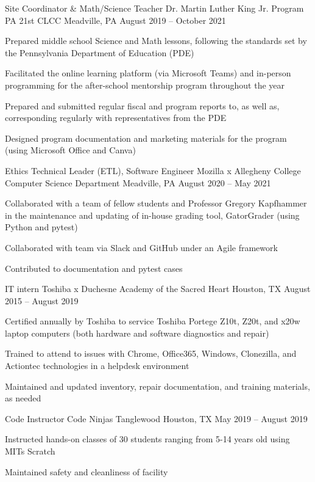 \begin{cventries}
    \cventry
    {Site Coordinator \& Math/Science Teacher}
    {Dr. Martin Luther King Jr. Program PA 21st CLCC}
    {Meadville, PA}
    {August 2019 – October 2021}
	{\begin{cvitems}
		\item {Prepared middle school Science and Math lessons, following the standards set by the Pennsylvania Department of Education (PDE)}
		\item {Facilitated the online learning platform (via Microsoft Teams) and in-person programming for the after-school mentorship program throughout the year}
		\item {Prepared and submitted regular fiscal and program reports to, as well as, corresponding regularly with representatives from the PDE}
		\item {Designed program documentation and marketing materials for the program (using Microsoft Office and Canva)}
	\end{cvitems}}
 
    \cventry
    {Ethics Technical Leader (ETL), Software Engineer}
    {Mozilla x Allegheny College Computer Science Department}
    {Meadville, PA}
    {August 2020 – May 2021}
        {\begin{cvitems}
		\item {Collaborated with a team of fellow students and Professor Gregory Kapfhammer in the maintenance and updating of in-house grading tool, GatorGrader (using Python and pytest)}
		\item {Collaborated with team via Slack and GitHub under an Agile framework}
		\item {Contributed to documentation and pytest cases}
	\end{cvitems}}
 
    \cventry
    {IT intern}
    {Toshiba x Duchesne Academy of the Sacred Heart}
    {Houston, TX}
    {August 2015 – August 2019}
        {\begin{cvitems}
		\item {Certified annually by Toshiba to service Toshiba Portege Z10t, Z20t, and x20w laptop computers (both hardware and software diagnostics and repair)}
		\item {Trained to attend to issues with Chrome, Office365, Windows, Clonezilla, and Actiontec technologies in a helpdesk environment}
		\item {Maintained and updated inventory, repair documentation, and training materials, as needed}
	\end{cvitems}}
 
    \cventry
    {Code Instructor}
    {Code Ninjas Tanglewood}
    {Houston, TX}
    {May 2019 – August 2019}
        {\begin{cvitems}
		\item {Instructed hands-on classes of 30 students ranging from 5-14 years old using MIT\textquotesingle{}s Scratch}
		\item {Maintained safety and cleanliness of facility}
	\end{cvitems}}
\end{cventries}
